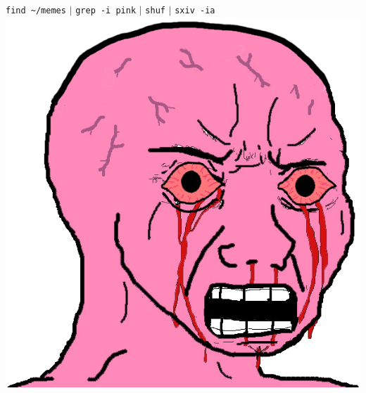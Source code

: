 \documentclass[11pt, english]{article}
\begin{document}
	\begin{center}	
		\verb|find ~/memes| $\mathtt{\vert}$ \verb|grep -i pink| $\mathtt{\vert}$ \verb|shuf| $\mathtt{\vert}$ \verb|sxiv -ia|\\[2cm]
		\includegraphics[width=14cm,height=14cm]{../System/Photos/pink.png}
	\end{center}

\newpage

	\renewcommand\refname{Bibliography}

	\fancyhead[L]{\leftmark}
\end{document}
